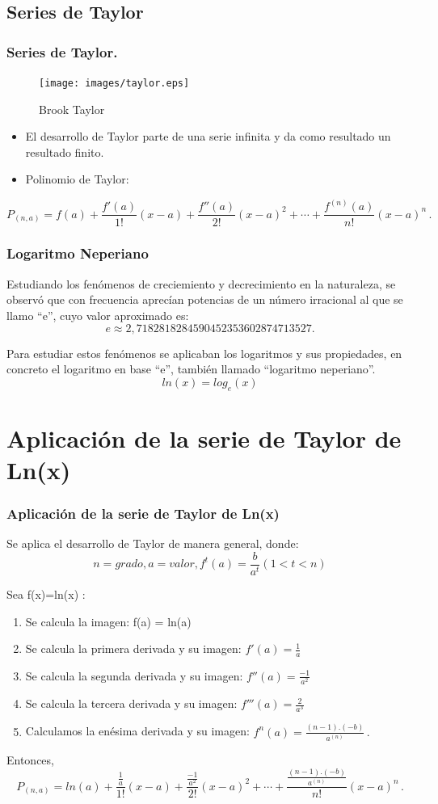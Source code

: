 \documentclass{beamer}
\begin{document}
\begin{frame}
\subsection{Series de Taylor}
\frametitle{Series de Taylor.}
\begin{figure}[!th]
\begin{center}
\texttt{[image: images/taylor.eps]}
\caption{Brook Taylor}
\label{fig:1}
\end{center}
\end{figure}
\begin{itemize}
\item El desarrollo de Taylor parte de una serie infinita y da como resultado un resultado finito.
\item Polinomio de Taylor:
\end{itemize}
 \[ P_{(n,a)} = f(a)+\frac{f'(a)}{1!}(x-a)+\frac{f''(a)}{2!}(x-a)^2+\cdots+\frac{f^{(n)}(a)}{n!} (x-a)^{n}\,. \]
\end{frame}


\begin{frame}
\frametitle{Logaritmo Neperiano} %
Estudiando los fenómenos de creciemiento y decrecimiento en la naturaleza, se observó que con frecuencia aprecían potencias de un número irracional al que se llamo ``e'', 
cuyo valor aproximado es:
 \[ e \approx 2,7182818284590452353602874713527. \] 

Para estudiar estos fenómenos se aplicaban los logaritmos y sus propiedades, en concreto el logaritmo en base ``e'', también llamado ``logaritmo neperiano''. 
\[ln(x)=log_e(x)\]
\end{frame}



\section{Aplicación de la serie de Taylor de Ln(x)}

\begin{frame}
\frametitle{Aplicación de la serie de Taylor de Ln(x)}
Se aplica el desarrollo de Taylor de manera general, donde:
\[n=grado, a=valor, f^t(a)= \frac{b}{a^t} (1<t<n)\]

Sea f(x)=ln(x) :

\begin{enumerate}
\item Se calcula la imagen:
f(a) = ln(a)
\item Se calcula la primera derivada y su imagen:
$f'(a) = \frac{1}{a}$ 
\item Se calcula la segunda derivada y su imagen:
$f''(a) = \frac{-1}{a^2}$
\item Se calcula la tercera derivada y su imagen:
$f'''(a) = \frac{2}{a^3}$
\item Calculamos la enésima derivada y su imagen:
$f^n(a) = \frac{(n-1).(-b)}{a^{(n)}}\,.$
\end{enumerate}
Entonces,
\[ P_{(n,a)} = ln(a)+\frac{\frac{1}{a}}{1!}(x-a)+\frac{\frac{-1}{a^2}}{2!}(x-a)^2+\cdots +\frac{ \frac{(n-1).(-b)}{a^{(n)}}}{n!} (x-a)^{n}\,. \]
\end{frame}
\end{document}

